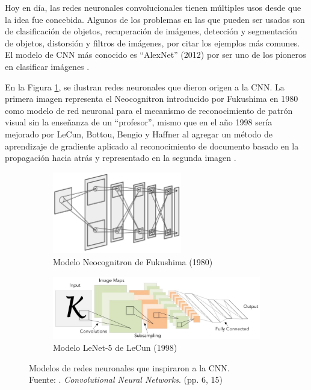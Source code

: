 \begin{itemize}
\begin{itemize}
		Hoy en día, las redes neuronales convolucionales tienen múltiples usos desde que la idea fue concebida. Algunos de los problemas en las que pueden ser usados son de clasificación de objetos, recuperación de imágenes, detección y segmentación de objetos, distorsión y filtros de imágenes, por citar los ejemplos más comunes. El modelo de CNN más conocido es “AlexNet” (2012) por ser uno de los pioneros en clasificar imágenes \parencite{tec_li2019cnn}.
		
		En la Figura \ref{2:fig25}, se ilustran redes neuronales que dieron origen a la CNN. La primera imagen representa el Neocognitron introducido por Fukushima en 1980 como modelo de red neuronal para el mecanismo de reconocimiento de patrón visual sin la enseñanza de un “profesor”, mismo que en el año 1998 sería mejorado por LeCun, Bottou, Bengio y Haffner al agregar un método de aprendizaje de gradiente aplicado al reconocimiento de documento basado en la propagación hacia atrás y representado en la segunda imagen \parencite{tec_li2019cnn}.
		
		\begin{figure}[!ht]
			\centering
			\small
			\begin{subfigure}{.5\textwidth}
				\centering
				\includegraphics[width=0.62\textwidth]{2/figures/neocognitron.jpg}
				\caption{Modelo Neocognitron de Fukushima (1980)}
			\end{subfigure}%
			\begin{subfigure}{.5\textwidth}
				\centering
				\includegraphics[width=1.22\textwidth]{2/figures/lenet5.jpg}
				\caption{Modelo LeNet-5 de LeCun (1998)}
			\end{subfigure}
			\caption[Modelos de redes neuronales que inspiraron a la CNN]{Modelos de redes neuronales que inspiraron a la CNN.\\
				Fuente: \cite{tec_li2019cnn}. \textit{Convolutional Neural Networks}. (pp. 6, 15)}
			\label{2:fig25}
		\end{figure}
		

\end{itemize}
\end{itemize}
